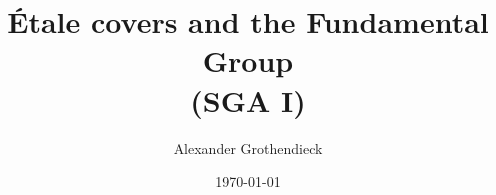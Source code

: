 \documentclass{amsbook}
\title{Étale covers and the Fundamental Group\\(SGA I)}
\author{Alexander Grothendieck}
\date{\today}
\begin{document}
\maketitle

\tableofcontents{}














\end{document}
